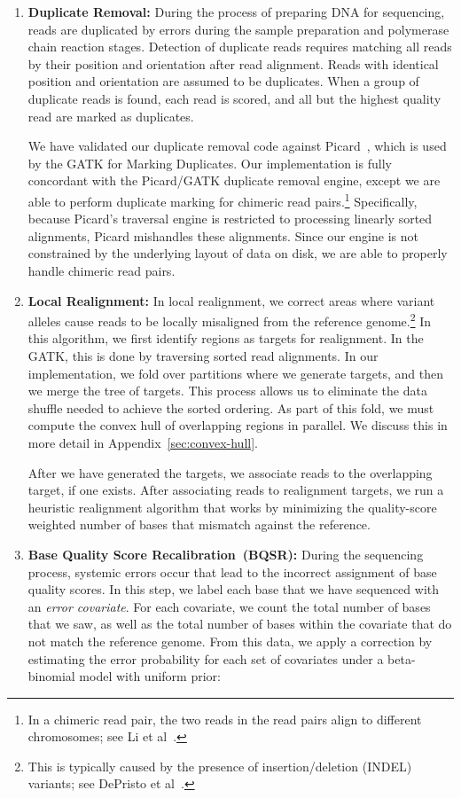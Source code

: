 \documentclass[masters]{ucbthesis}
\begin{document}
\begin{enumerate}
\item \textbf{Duplicate Removal:} During the process of preparing DNA for sequencing, reads are duplicated by
errors during the sample preparation and polymerase chain reaction stages. Detection of duplicate reads
requires matching all reads by their position and orientation after read alignment. Reads with identical position
and orientation are assumed to be duplicates. When a group of duplicate reads is found, each read is scored,
and all but the highest quality read are marked as duplicates.

We have validated our duplicate removal code against Picard~\cite{picard}, which is used by the GATK
for Marking Duplicates. Our implementation is fully concordant with the Picard/GATK duplicate removal
engine, except we are able to perform duplicate marking for chimeric read pairs.\footnote{In a chimeric read pair,
the two reads in the read pairs align to different chromosomes; see Li et al~\cite{li10}.}
Specifically, because Picard's traversal engine is restricted to processing linearly sorted alignments,
Picard mishandles these alignments. Since our engine is not constrained by the underlying layout of data
on disk, we are able to properly handle chimeric read pairs.
\item \textbf{Local Realignment:} In local realignment, we correct areas where variant alleles cause reads to be
locally misaligned from the reference genome.\footnote{This is typically caused by the presence of
insertion/deletion (INDEL) variants; see DePristo et al~\cite{depristo11}.} In this algorithm, we first identify regions
as targets for realignment. In the GATK, this is done by traversing sorted read alignments. In our implementation,
we fold over partitions where we generate targets, and then we merge the tree of targets. This process allows us
to eliminate the data shuffle needed to achieve the sorted ordering. As part of this fold, we must
compute the convex hull of overlapping regions in parallel. We discuss this in more detail in
Appendix~\ref{sec:convex-hull}.

After we have generated the targets, we associate reads to the overlapping target, if one exists. After
associating reads to realignment targets, we run a heuristic realignment algorithm that works by minimizing
the quality-score weighted number of bases that mismatch against the reference.
\item \textbf{Base Quality Score Recalibration~(BQSR):} During the sequencing process, systemic errors occur
that lead to the incorrect assignment of base quality scores. In this step, we label each base that we have
sequenced with an \emph{error covariate}. For each covariate, we count the total number of bases that we saw,
as well as the total number of bases within the covariate that do not match the reference genome. From this data, 
we apply a correction by estimating the error probability for each set of covariates under a beta-binomial model
with uniform prior:


\end{enumerate}
\end{document}
